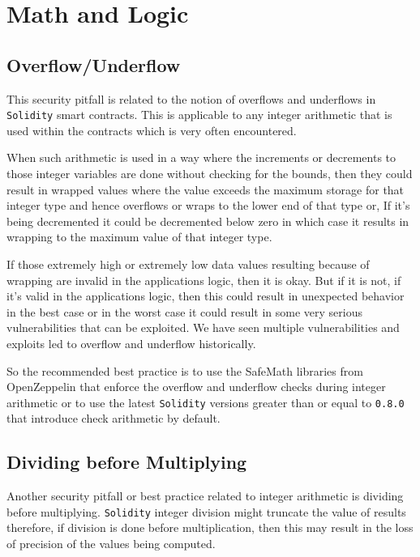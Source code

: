 \section{Math and Logic}\label{math-and-logic}

\subsection{Overflow/Underflow}\label{overflowunderflow}

This security pitfall is related to the notion of overflows and
underflows in \texttt{Solidity} smart contracts. This is applicable to
any integer arithmetic that is used within the contracts which is very
often encountered.

When such arithmetic is used in a way where the increments or decrements
to those integer variables are done without checking for the bounds,
then they could result in wrapped values where the value exceeds the
maximum storage for that integer type and hence overflows or wraps to
the lower end of that type or, If it's being decremented it could be
decremented below zero in which case it results in wrapping to the
maximum value of that integer type.

If those extremely high or extremely low data values resulting because
of wrapping are invalid in the applications logic, then it is okay. But
if it is not, if it's valid in the applications logic, then this could
result in unexpected behavior in the best case or in the worst case it
could result in some very serious vulnerabilities that can be exploited.
We have seen multiple vulnerabilities and exploits led to overflow and
underflow historically.

So the recommended best practice is to use the SafeMath libraries from
OpenZeppelin that enforce the overflow and underflow checks during
integer arithmetic or to use the latest \texttt{Solidity} versions
greater than or equal to \texttt{0.8.0} that introduce check arithmetic
by default.

\subsection{Dividing before
Multiplying}\label{dividing-before-multiplying}

Another security pitfall or best practice related to integer arithmetic
is dividing before multiplying. \texttt{Solidity} integer division might
truncate the value of results therefore, if division is done before
multiplication, then this may result in the loss of precision of the
values being computed.

